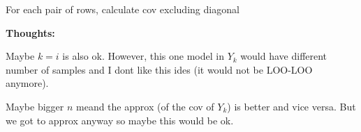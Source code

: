 \documentclass[a4paper, fleqn]{article}
\begin{document}
For each pair of rows, calculate cov excluding diagonal


\textbf{Thoughts:}

Maybe $k=i$ is also ok. However, this one model in $Y_k$ would have different number of samples and I dont like this ides (it would not be LOO-LOO anymore).

Maybe bigger $n$ meand the approx (of the cov of $Y_k$) is better and vice versa. But we got to approx anyway so maybe this would be ok.
\end{document}
